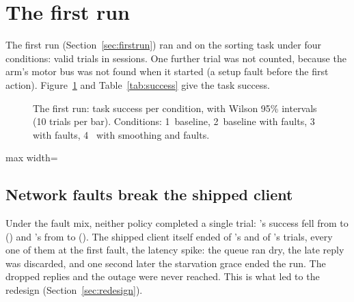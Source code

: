 
\section{The first run}\label{sec:main}

The first run (Section~\ref{sec:firstrun}) ran \smolvla{} and \groot{} on the sorting task under four conditions:
 valid trials in  sessions. One further trial was not counted, because the arm's motor bus was not found when it
started (a setup fault before the first action). Figure~\ref{fig:success} and Table~\ref{tab:success} give the task
success.

\begin{figure}[htbp]
  \centering
  \caption{The first run: task success per condition, with Wilson 95\% intervals (10 trials per bar). Conditions:
           1~baseline, 2~baseline with faults, 3~\drtc{} with faults, 4~\drtc{} with smoothing and faults.}
  \label{fig:success}
\end{figure}

\begin{table}[htbp]
  \centering
  \small
  \begin{adjustbox}{max width=\textwidth}
  \end{adjustbox}
  \caption{Task success, its 95\% interval, and the trials ended by a fault.}\label{tab:success}
\end{table}

\subsection{Network faults break the shipped client}

Under the fault mix, neither policy completed a single trial: \smolvla's success fell from 
to  () and \groot's from  to
 (). The shipped client itself ended
 of \smolvla's and  of \groot's trials, every one of them at the
first fault, the latency spike: the queue ran dry, the late reply was discarded, and one second later the starvation
grace ended the run. The dropped replies and the outage were never reached. This is what led to the redesign
(Section~\ref{sec:redesign}).


